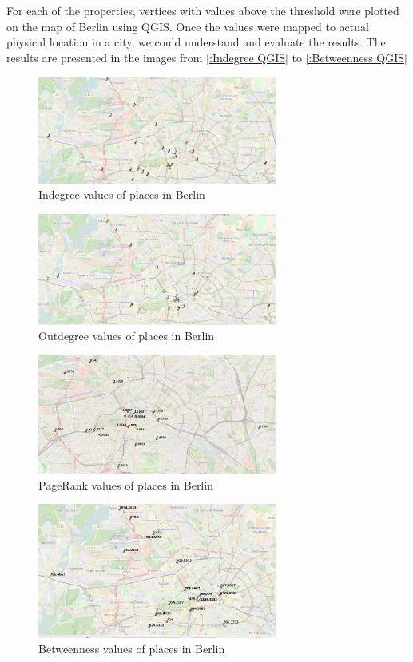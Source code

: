 For each of the properties, vertices with values above the threshold were plotted on the map of Berlin using QGIS. Once the values were mapped to actual physical location in a city, we could understand and evaluate the results. The results are presented in the images from \autoref{:Indegree QGIS}  to \autoref{:Betweenness QGIS} 
\begin{figure}[!ht]
	\centering
	\includegraphics[width=0.7\textwidth]{images/indegree_qgis.png}
	\caption{ Indegree values of places in Berlin}
	\label{:Indegree QGIS}
\end{figure} 
\begin{figure}[!ht]
	\centering
	\includegraphics[width=0.7\textwidth]{images/outdegree_qgis.png}
	\caption{ Outdegree values of places in Berlin}
	\label{:Outdegree QGIS}
\end{figure} 
\begin{figure}[!ht]
	\centering
	\includegraphics[width=0.7\textwidth]{images/pagerank_qgis.png}
	\caption{PageRank values of places in Berlin}
	\label{:PageRank QGIS}
\end{figure} 
\FloatBarrier

\begin{figure}[!ht]
	\centering
	\includegraphics[width=0.7\textwidth]{images/betweenness_qgis.png}
	\caption{ Betweenness values of places in Berlin}
	\label{:Betweenness QGIS}
\end{figure}
\FloatBarrier

